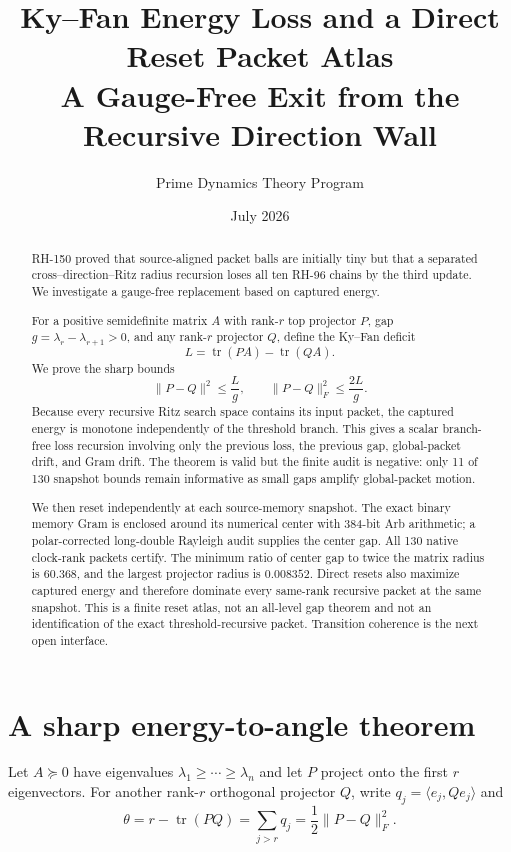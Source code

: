 \documentclass[12pt]{article}
\title{Ky--Fan Energy Loss and a Direct Reset Packet Atlas\\\large A Gauge-Free Exit from the Recursive Direction Wall}
\author{Prime Dynamics Theory Program}
\date{July 2026}
\begin{document}
\maketitle

\begin{abstract}
RH-150 proved that source-aligned packet balls are initially tiny but that a
separated cross--direction--Ritz radius recursion loses all ten RH-96 chains
by the third update.  We investigate a gauge-free replacement based on
captured energy.

For a positive semidefinite matrix $A$ with rank-$r$ top projector $P$, gap
$g=\lambda_r-\lambda_{r+1}>0$, and any rank-$r$ projector $Q$, define the
Ky--Fan deficit
\[
 L=\operatorname{tr}(PA)-\operatorname{tr}(QA).
\]
We prove the sharp bounds
\[
 \|P-Q\|^2\leq \frac Lg,
 \qquad
 \|P-Q\|_F^2\leq\frac{2L}{g}.
\]
Because every recursive Ritz search space contains its input packet, the
captured energy is monotone independently of the threshold branch.  This
gives a scalar branch-free loss recursion involving only the previous loss,
the previous gap, global-packet drift, and Gram drift.  The theorem is valid
but the finite audit is negative: only 11 of 130 snapshot bounds remain
informative as small gaps amplify global-packet motion.

We then reset independently at each source-memory snapshot.  The exact binary
memory Gram is enclosed around its numerical center with 384-bit Arb
arithmetic; a polar-corrected long-double Rayleigh audit supplies the center
gap.  All 130 native clock-rank packets certify.  The minimum ratio of center
gap to twice the matrix radius is $60.368$, and the largest projector radius
is $0.008352$.  Direct resets also maximize captured energy and therefore
dominate every same-rank recursive packet at the same snapshot.  This is a
finite reset atlas, not an all-level gap theorem and not an identification of
the exact threshold-recursive packet.  Transition coherence is the next open
interface.
\end{abstract}

\section{A sharp energy-to-angle theorem}
Let $A\succeq0$ have eigenvalues
$\lambda_1\geq\cdots\geq\lambda_n$ and let $P$ project onto the first $r$
eigenvectors.  For another rank-$r$ orthogonal projector $Q$, write
$q_j=\langle e_j,Qe_j\rangle$ and
\[
 \theta=r-\operatorname{tr}(PQ)
 =\sum_{j>r}q_j=\frac12\|P-Q\|_F^2.
\]
\end{document}
